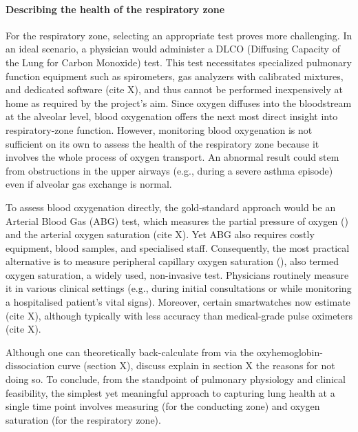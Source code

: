 \paragraph{Describing the health of the respiratory zone}
For the respiratory zone, selecting an appropriate test proves more challenging. In an ideal scenario, a physician would administer a DLCO (Diffusing Capacity of the Lung for Carbon Monoxide) test. This test necessitates specialized pulmonary function equipment such as spirometers, gas analyzers with calibrated mixtures, and dedicated software (cite X), and thus cannot be performed inexpensively at home as required by the project's aim. Since oxygen diffuses into the bloodstream at the alveolar level, blood oxygenation offers the next most direct insight into respiratory-zone function. However, monitoring blood oxygenation is not sufficient on its own to assess the health of the respiratory zone because it involves the whole process of oxygen transport. An abnormal result could stem from obstructions in the upper airways (e.g., during a severe asthma episode) even if alveolar gas exchange is normal.

To assess blood oxygenation directly, the gold-standard approach would be an Arterial Blood Gas (ABG) test, which measures the partial pressure of oxygen (\PA) and the arterial oxygen saturation (cite X). Yet ABG also requires costly equipment, blood samples, and specialised staff. Consequently, the most practical alternative is to measure peripheral capillary oxygen saturation (\SP), also termed oxygen saturation, a widely used, non-invasive test. Physicians routinely measure it in various clinical settings (e.g., during initial consultations or while monitoring a hospitalised patient's vital signs). Moreover, certain smartwatches now estimate \SP (cite X), although typically with less accuracy than medical-grade pulse oximeters (cite X).

Although one can theoretically back-calculate \PA from \SP via the oxyhemoglobin-dissociation curve (section X), discuss explain in section X the reasons for not doing so. To conclude, from the standpoint of pulmonary physiology and clinical feasibility, the simplest yet meaningful approach to capturing lung health at a single time point involves measuring \F (for the conducting zone) and oxygen saturation (for the respiratory zone).


